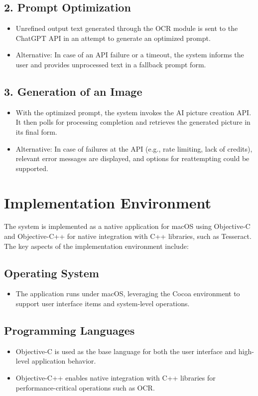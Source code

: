 \subsection*{2. Prompt Optimization}
\begin{itemize}
    \item Unrefined output text generated through the OCR module is sent to the ChatGPT API in an attempt to generate an optimized prompt.
    \item Alternative: In case of an API failure or a timeout, the system informs the user and provides unprocessed text in a fallback prompt form.
\end{itemize}

\subsection*{3. Generation of an Image}
\begin{itemize}
    \item With the optimized prompt, the system invokes the AI picture creation API. It then polls for processing completion and retrieves the generated picture in its final form.
    \item Alternative: In case of failures at the API (e.g., rate limiting, lack of credits), relevant error messages are displayed, and options for reattempting could be supported.
\end{itemize}

\section{Implementation Environment}

The system is implemented as a native application for macOS using Objective-C and Objective-C++ for native integration with C++ libraries, such as Tesseract. The key aspects of the implementation environment include:

\subsection*{Operating System}
\begin{itemize}
    \item The application runs under macOS, leveraging the Cocoa environment to support user interface items and system-level operations.
\end{itemize}

\subsection*{Programming Languages}
\begin{itemize}
    \item Objective-C is used as the base language for both the user interface and high-level application behavior.
    \item Objective-C++ enables native integration with C++ libraries for performance-critical operations such as OCR.
\end{itemize}

